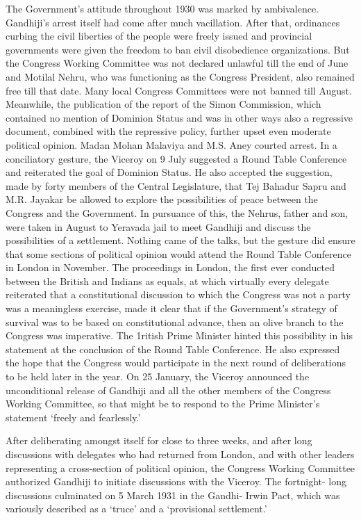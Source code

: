 The Government's attitude throughout 1930 was marked by ambivalence. Gandhiji's arrest itself had come after much vacillation. After that, ordinances curbing the civil liberties of the people were freely issued and provincial governments were given the freedom to ban civil disobedience organizations. But the Congress Working Committee was not declared unlawful till the end of June and Motilal Nehru, who was functioning as the Congress President, also remained free till that date. Many local Congress Committees were not banned till August. Meanwhile, the publication of the report of the Simon Commission, which contained no mention of Dominion Status and was in other ways also a regressive document, combined with the repressive policy, further upset even moderate political opinion. Madan Mohan Malaviya and M.S. Aney courted arrest. In a conciliatory gesture, the Viceroy on 9 July suggested a Round Table Conference and reiterated the goal of Dominion Status. He also accepted the suggestion, made by forty members of the Central Legislature, that Tej Bahadur Sapru and M.R. Jayakar be allowed to explore the possibilities of peace between the Congress and the Government. In pursuance of this, the Nehrus, father and son, were taken in August to Yeravada jail to meet Gandhiji and discuss the possibilities of a settlement. Nothing came of the talks, but the gesture did ensure that some sections of political opinion would attend the Round Table Conference in London in November. The proceedings in London, the first ever conducted between the British and Indians as equals, at which virtually every delegate reiterated that a constitutional discussion to which the Congress was not a party was a meaningless exercise, made it clear that if the Government's strategy of survival was to be based on constitutional advance, then an olive branch to the Congress was imperative. The 1ritish Prime Minister hinted this possibility in his statement at the conclusion of the Round Table Conference. He also expressed the hope that the Congress would participate in the next round of deliberations to be held later in the year. On 25 January, the Viceroy announced the unconditional release of Gandhiji and all the other members of the Congress Working Committee, so that might be to respond to the Prime Minister's statement `freely and fearlessly.' 

After deliberating amongst itself for close to three weeks, and after long discussions with delegates who had returned from London, and with other leaders representing a cross-section of political opinion, the Congress Working Committee authorized Gandhiji to initiate discussions with the Viceroy. The fortnight- long discussions culminated on 5 March 1931 in the Gandhi- Irwin Pact, which was variously described as a `truce' and a `provisional settlement.' 

